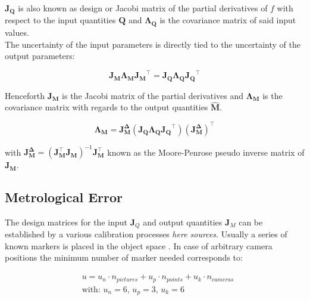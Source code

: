 \documentclass[5p,times,procedia]{elsarticle}
\begin{document}
$\mathbf{J_{Q}}$ is also known as design or Jacobi matrix of the partial derivatives of $f$ with respect to the input quantities $\mathbf{Q}$ and $\mathbf{\Lambda_Q}$ is the covariance matrix of said  input values. \\

The uncertainty of the input parameters is directly tied to the uncertainty of the output parameters:

\begin{equation}
	\mathbf{J_{M}}\mathbf{\Lambda_{M}}\mathbf{J_{M}}^{\top} = \mathbf{J_{Q}}\mathbf{\Lambda_{Q}}\mathbf{J_{Q}}^{\top}
\end{equation}

Henceforth $\mathbf{J_{M}}$ is the Jacobi matrix of the partial derivatives and $\mathbf{\Lambda_{M}}$ is the covariance matrix with regards to the output quantities $\hat{\mathbf{M}}$.

\begin{equation}
	\mathbf{\Lambda_{M}} = \mathbf{J_{M}^{\Delta}} \left( \mathbf{J_{Q}}\mathbf{\Lambda_{Q}}\mathbf{J_{Q}}^{\top}\right) \left(\mathbf{J_{M}^{\Delta}}\right)^{\top}
\end{equation}

with $ \mathbf{J_{M}^{\Delta}} = \left( \mathbf{J_{M}^{\top}} \mathbf{J_{M}^{}} \right)^{-1}\mathbf{J_{M}^{\top}}
$ known as the Moore-Penrose pseudo inverse matrix of $\mathbf{J_M}$. \\

\subsection{Metrological Error}
\label{error_estimate}

The design matrices for the input $\mathbf{J}_{Q}$ and output quantities $\mathbf{J}_{M}$ can be established by a various calibration processes \textit{here sources}. Usually a series of known markers is placed in the object space \cite{Luhmann2003}. In case of arbitrary camera positions the minimum number of marker needed corresponds to:

\begin{equation}
	\label{eqn:NumCalibPoints}
	\begin{aligned}
		& 	u = u_n \cdot n_{pictures} + u_p \cdot n_{points} + u_k \cdot n_{cameras} \\
		& \text{with: } u_n = 6\text{, } u_p = 3\text{, } u_k = 6 
	\end{aligned}
\end{equation}
\end{document}
